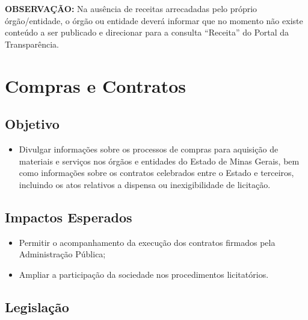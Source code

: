 \documentclass[
]{book}
\providecommand{\tightlist}{%
  \setlength{\itemsep}{0pt}\setlength{\parskip}{0pt}}
\begin{document}
\textbf{OBSERVAÇÃO:} Na ausência de receitas arrecadadas pelo próprio órgão/entidade, o órgão ou entidade deverá informar que no momento não existe conteúdo a ser publicado e direcionar para a consulta ``Receita'' do Portal da Transparência.

\hypertarget{compras-e-contratos}{%
\section{Compras e Contratos}\label{compras-e-contratos}}

\hypertarget{objetivo-5}{%
\subsection{Objetivo}\label{objetivo-5}}

\begin{itemize}
\tightlist
\item
  Divulgar informações sobre os processos de compras para aquisição de materiais e serviços nos órgãos e entidades do Estado de Minas Gerais, bem como informações sobre os contratos celebrados entre o Estado e terceiros, incluindo os atos relativos a dispensa ou inexigibilidade de licitação.
\end{itemize}

\hypertarget{impactos-esperados-6}{%
\subsection{Impactos Esperados}\label{impactos-esperados-6}}

\begin{itemize}
\tightlist
\item
  Permitir o acompanhamento da execução dos contratos firmados pela Administração Pública;
\item
  Ampliar a participação da sociedade nos procedimentos licitatórios.
\end{itemize}

\hypertarget{legislauxe7uxe3o-6}{%
\subsection{Legislação}\label{legislauxe7uxe3o-6}}
\end{document}
